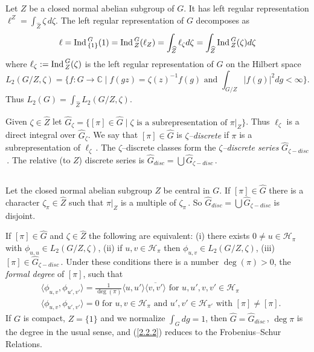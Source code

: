 \documentclass{conm-p-l}
\def\Ind{{\rm Ind\,}}
\def\C{\mathbb{C}}
\def\cH{\mathcal{H}}
\begin{document}
\subsection{}\label{ssec2a}  
\setcounter{equation}{0}
Let $Z$ be a closed normal abelian subgroup of
$G$. It has left regular representation 
$\ell^Z = \int_{\widehat{Z}}\zeta\, d\zeta$.  The left regular
representation of $G$ decomposes as
\begin{equation}\label{2.1.1}
\ell = \Ind_{\{1\}}^G(1) = \Ind_Z^G(\ell_Z) = 
  \int_{\widehat{Z}} \ell_\zeta d\zeta = 
  \int_{\widehat{Z}} \Ind_Z^G(\zeta)d\zeta
\end{equation}
where $\ell_\zeta := \Ind_Z^G(\zeta)$ is the left regular representation of
$G$ on the Hilbert space
{\footnotesize
\begin{equation}\label{2.1.2}
L_2(G/Z,\zeta) = \{f:G \to \C \mid f(gz) = \zeta(z)^{-1}f(g) \text{ and }
	\int_{G/Z} |f(g)|^2 dg < \infty \}.
\end{equation}
}
Thus $L_2(G) = \int_{\widehat{Z}} L_2(G/Z,\zeta)$.

Given $\zeta \in \widehat{Z}$ let $\widehat{G}_\zeta = \{[\pi] \in
\widehat{G} \mid \zeta \text{ is a subrepresentation of } \pi|_Z\}$.
Thus $\ell_\zeta$ is a direct integral over $\widehat{G}_\zeta$.  We
say that $[\pi] \in \widehat{G}$ is {\em $\zeta$--discrete} if $\pi$
is a subrepresentation of $\ell_\zeta$\,.  The $\zeta$--discrete
classes form the {\em $\zeta$--discrete series} $\widehat{G}_{\zeta-disc}$\,.
The {\rm relative (to $Z$) discrete series} is 
$\widehat{G}_{disc} = \bigcup \widehat{G}_{\zeta-disc}$\,.

\subsection{}\label{ssec2b}
\setcounter{equation}{0}
Let the closed normal abelian subgroup $Z$ be central in $G$.
If $[\pi] \in \widehat{G}$ there is a character $\zeta_\pi \in \widehat{Z}$
such that $\pi|_Z$ is a multiple of $\zeta_\pi$\,.  So
$\widehat{G}_{disc} = \bigcup \widehat{G}_{\zeta-disc}$ is disjoint.

If $[\pi] \in \widehat{G}$ and $\zeta \in \widehat{Z}$ the following are 
equivalent: (i) there exists $0 \ne u \in \cH_\pi$ with $\phi_{u,u}
\in L_2(G/Z,\zeta)$, (ii) if $u, v \in \cH_\pi$ then $\phi_{u,v} \in
L_2(G/Z,\zeta)$, (iii) $[\pi] \in \widehat{G}_{\zeta-disc}$\,.  Under
these conditions there is a number $\deg(\pi) > 0$, the {\em formal degree}
of $[\pi]$, such that
\begin{equation}\label{2.2.2}
\begin{aligned}
&\langle \phi_{u,v},\phi_{u',v'} \rangle = \tfrac{1}{\deg(\pi)}
		\langle u, u'\rangle \overline{\langle v, v'\rangle}
		\text{ for } u,u',v,v' \in \cH_\pi \\
&\langle \phi_{u,v},\phi_{u',v'} \rangle = 0 \text{ for }
	u,v \in \cH_\pi \text{ and } u', v' \in \cH_{\pi'}
	\text{ with } [\pi] \ne [\pi]. 
\end{aligned}
\end{equation}
If $G$ is compact, $Z = \{1\}$ and we normalize $\int_G dg = 1$, then
$\widehat{G} = \widehat{G}_{disc}$\,, $\deg{\pi}$ is the degree in
the usual sense, and (\ref{2.2.2}) reduces to the Frobenius--Schur
Relations.  
\end{document}
